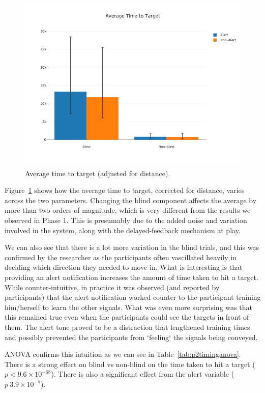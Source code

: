 \documentclass[
12pt, %
oneside, %
english, %
doublespacing, %
headsepline, %
]{MastersDoctoralThesis} %
\begin{document}
\begin{figure}[h]
	\centering\includegraphics[width=1\linewidth]{images/timetotarget}
	\decoRule
	\caption[Phase 2 Time to Target]{Average time to target (adjusted for distance).}
	\label{fig:p2time}
\end{figure}

Figure~\ref{fig:p2time} shows how the average time to target, corrected for distance, varies across the two parameters. Changing the blind component affects the average by more than two orders of magnitude, which is very different from the results we observed in Phase 1. This is presumably due to the added noise and variation involved in the system, along with the delayed-feedback mechanism at play.

We can also see that there is a lot more variation in the blind trials, and this was confirmed by the researcher as the participants often vascillated heavily in deciding which direction they needed to move in. What is interesting is that providing an alert notification increases the amount of time taken to hit a target. While counter-intuitive, in practice it was observed (and reported by participants) that the alert notification worked counter to the participant training him/herself to learn the other signals. What was even more surprising was that this remained true even when the participants could see the targets in front of them. The alert tone proved to be a distraction that lengthened training times and possibly prevented the participants from `feeling` the signals being conveyed.

ANOVA confirms this intuition as we can see in Table~\ref{tab:p2timinganova}. There is a strong effect on blind vs non-blind on the time taken to hit a target ($p < 9.6 \times 10^{-68}$). There is also a significant effect from the alert variable ($p ~ 3.9 \times 10^{-5}$).
\end{document}
